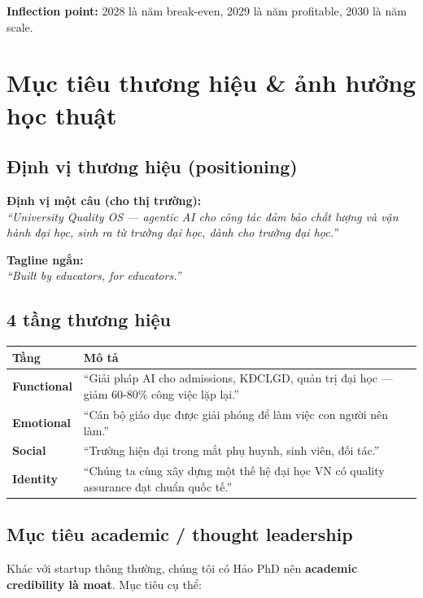 \documentclass[11pt,a4paper]{article}
\begin{document}
\textbf{Inflection point:} 2028 là năm break-even, 2029 là năm profitable, 2030 là năm scale.

\clearpage

\section{Mục tiêu thương hiệu \& ảnh hưởng học thuật}

\subsection{Định vị thương hiệu (positioning)}

\textbf{Định vị một câu (cho thị trường):}\\
\textit{``University Quality OS — agentic AI cho công tác đảm bảo chất lượng và
vận hành đại học, sinh ra từ trường đại học, dành cho trường đại học.''}

\textbf{Tagline ngắn:}\\
\textit{``Built by educators, for educators.''}

\subsection{4 tầng thương hiệu}

\begin{tabularx}{\linewidth}{@{}p{2.5cm} X@{}}
\toprule
\textbf{Tầng} & \textbf{Mô tả} \\
\midrule
\textbf{Functional} & ``Giải pháp AI cho admissions, KĐCLGD, quản trị đại học --- giảm 60-80\% công việc lặp lại.'' \\
\textbf{Emotional} & ``Cán bộ giáo dục được giải phóng để làm việc con người nên làm.'' \\
\textbf{Social} & ``Trường hiện đại trong mắt phụ huynh, sinh viên, đối tác.'' \\
\textbf{Identity} & ``Chúng ta cùng xây dựng một thế hệ đại học VN có quality assurance đạt chuẩn quốc tế.'' \\
\bottomrule
\end{tabularx}

\subsection{Mục tiêu academic / thought leadership}

Khác với startup thông thường, chúng tôi có Hảo PhD nên \textbf{academic
credibility là moat}. Mục tiêu cụ thể:
\end{document}
